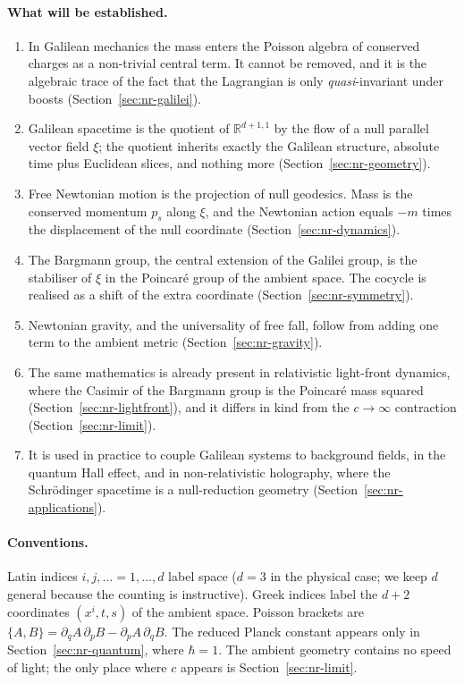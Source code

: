 \paragraph{What will be established.}
\begin{enumerate}
\item In Galilean mechanics the mass enters the Poisson algebra of conserved
      charges as a non-trivial central term. It cannot be removed, and it is
      the algebraic trace of the fact that the Lagrangian is only
      \emph{quasi}-invariant under boosts (Section~\ref{sec:nr-galilei}).
\item Galilean spacetime is the quotient of $\mathbb{R}^{d+1,1}$ by the flow of
      a null parallel vector field $\xi$; the quotient inherits exactly the
      Galilean structure, absolute time plus Euclidean slices, and nothing more
      (Section~\ref{sec:nr-geometry}).
\item Free Newtonian motion is the projection of null geodesics. Mass is the
      conserved momentum $p_s$ along $\xi$, and the Newtonian action equals
      $-m$ times the displacement of the null coordinate
      (Section~\ref{sec:nr-dynamics}).
\item The Bargmann group, the central extension of the Galilei group, is the
      stabiliser of $\xi$ in the Poincar\'e group of the ambient space. The
      cocycle is realised as a shift of the extra coordinate
      (Section~\ref{sec:nr-symmetry}).
\item Newtonian gravity, and the universality of free fall, follow from adding
      one term to the ambient metric (Section~\ref{sec:nr-gravity}).
\item The same mathematics is already present in relativistic light-front
      dynamics, where the Casimir of the Bargmann group is the Poincar\'e mass
      squared (Section~\ref{sec:nr-lightfront}), and it differs in kind from
      the $c\to\infty$ contraction (Section~\ref{sec:nr-limit}).
\item It is used in practice to couple Galilean systems to background fields,
      in the quantum Hall effect, and in non-relativistic holography, where
      the Schr\"odinger spacetime is a null-reduction geometry
      (Section~\ref{sec:nr-applications}).
\end{enumerate}

\paragraph{Conventions.}
Latin indices $i,j,\dots=1,\dots,d$ label space ($d=3$ in the physical case;
we keep $d$ general because the counting is instructive). Greek indices
label the $d+2$ coordinates $(x^i,t,s)$ of the ambient space. Poisson brackets
are $\{A,B\}=\partial_{q}A\,\partial_{p}B-\partial_{p}A\,\partial_{q}B$.
The reduced Planck constant appears only in Section~\ref{sec:nr-quantum}, where
$\hbar=1$. The ambient geometry contains no speed of light; the only place
where $c$ appears is Section~\ref{sec:nr-limit}.

